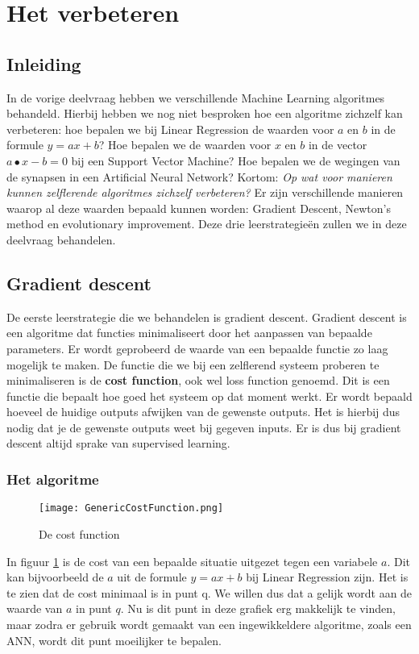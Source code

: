 \section{Het verbeteren}

\subsection{Inleiding}
In de vorige deelvraag hebben we verschillende Machine Learning algoritmes behandeld. Hierbij hebben we nog niet besproken hoe een algoritme zichzelf kan verbeteren: hoe bepalen we bij Linear Regression de waarden voor $a$ en $b$ in de formule $ y = ax + b $? Hoe bepalen we de waarden voor  $x$ en $b$ in de vector $ a ∙ x - b = 0 $ bij een Support Vector Machine? Hoe bepalen we de wegingen van de synapsen in een Artificial Neural Network? Kortom: \textit{Op wat voor manieren kunnen zelflerende algoritmes zichzelf verbeteren?} Er zijn verschillende manieren waarop al deze waarden bepaald kunnen worden: Gradient Descent, Newton's method en evolutionary improvement. Deze drie leerstrategieën zullen we in deze deelvraag behandelen.

\subsection{Gradient descent}
De eerste leerstrategie die we behandelen is gradient descent. Gradient descent is een algoritme dat functies minimaliseert door het aanpassen van bepaalde parameters. Er wordt geprobeerd de waarde van een bepaalde functie zo laag mogelijk te maken. De functie die we bij een zelflerend systeem proberen te minimaliseren is de \textbf{cost function}, ook wel loss function genoemd. Dit is een functie die bepaalt hoe goed het systeem op dat moment werkt. Er wordt bepaald hoeveel de huidige outputs afwijken van de gewenste outputs. Het is hierbij dus nodig dat je de gewenste outputs weet bij gegeven inputs. Er is dus bij gradient descent altijd sprake van supervised learning. 

\subsubsection{Het algoritme} 
\begin{figure}[h]
  \centering
    \texttt{[image: GenericCostFunction.png]}
  \caption{De cost function}
  \label{fig:GenericCostFunction}
\end{figure}

In figuur \ref{fig:GenericCostFunction} is de cost van een bepaalde situatie uitgezet tegen een variabele $a$. Dit kan bijvoorbeeld de $a$ uit de formule $ y = ax + b $ bij Linear Regression zijn.  Het is te zien dat de cost minimaal is in punt q. We willen dus dat a gelijk wordt aan de waarde van $a$ in punt $q$. Nu is dit punt in deze grafiek erg makkelijk te vinden, maar zodra er gebruik wordt gemaakt van een ingewikkeldere algoritme, zoals een ANN, wordt dit punt moeilijker te bepalen.


